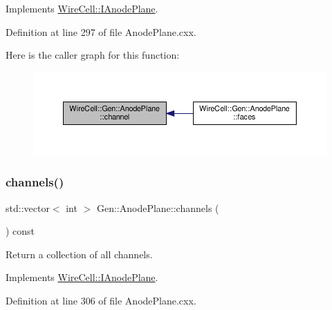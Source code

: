 Implements \hyperlink{class_wire_cell_1_1_i_anode_plane_ab9cab29e958c7cc4aa7dd9cb600c33cd}{Wire\+Cell\+::\+I\+Anode\+Plane}.



Definition at line 297 of file Anode\+Plane.\+cxx.

Here is the caller graph for this function\+:
\nopagebreak
\begin{figure}[H]
\begin{center}
\leavevmode
\includegraphics[width=350pt]{class_wire_cell_1_1_gen_1_1_anode_plane_ae5d1df06d19a616c9d0c46a0b74f7c81_icgraph}
\end{center}
\end{figure}
\mbox{\label{class_wire_cell_1_1_gen_1_1_anode_plane_ad934104bec0191d14920a1ef01cc8f00}} 
\subsubsection{\texorpdfstring{channels()}{channels()}}
{\footnotesize\ttfamily std\+::vector$<$ int $>$ Gen\+::\+Anode\+Plane\+::channels (\begin{DoxyParamCaption}{ }\end{DoxyParamCaption}) const\hspace{0.3cm}{\ttfamily [virtual]}}



Return a collection of all channels. 



Implements \hyperlink{class_wire_cell_1_1_i_anode_plane_a8de1ff56146e343b9ad266eaa011065a}{Wire\+Cell\+::\+I\+Anode\+Plane}.



Definition at line 306 of file Anode\+Plane.\+cxx.

